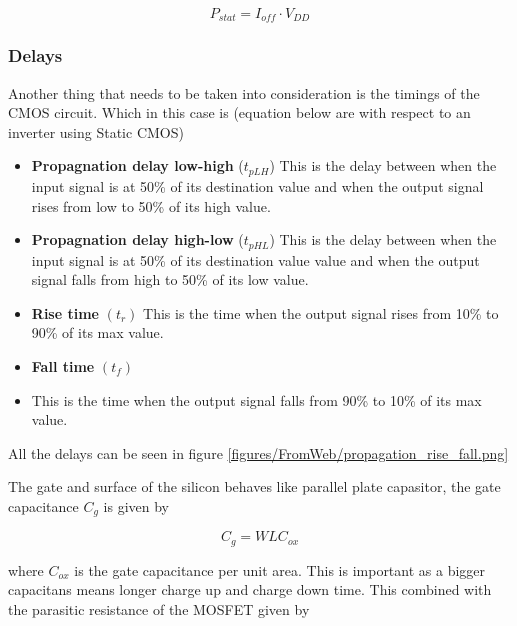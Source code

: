 \begin{equation}
    P_{stat}=I_{off}\cdot V_{DD}
    \label{eq:leakage_power}
\end{equation}

\subsubsection{Delays}
Another thing that needs to be taken into consideration is the timings of the CMOS circuit. Which in this case is (equation below are with respect to an inverter using Static CMOS) \cite{departmentofelectronicsystemsntnu_2023_delay}
\begin{itemize}
    \item \textbf{Propagnation delay low-high} ($t_{pLH}$)
    \subitem This is the delay between when the input signal is at 50\% of its destination value and when the output signal rises from low to 50\% of its high value.
    \item \textbf{Propagnation delay high-low} ($t_{pHL}$)
    \subitem This is the delay between when the input signal is at 50\% of its destination value value and when the output signal falls from high to 50\% of its low value.\cite{wikipediacontributors_2023_signal}
    \item \textbf{Rise time} $\left(t_r\right)$
    \subitem This is the time when the output signal rises from 10\% to 90\% of its max value.
    \item \textbf{Fall time} $\left(t_f\right)$
    \item \subitem This is the time when the output signal falls from 90\% to 10\% of its max value.
\end{itemize}

All the delays can be seen in figure \ref{figures/FromWeb/propagation_rise_fall.png}


The gate and surface of the silicon behaves like parallel plate capasitor, the gate capacitance $C_g$ is given by \cite[p. 18]{carusone_2012_analog}

\begin{equation}
    C_g=WLC_{ox}
    \label{eq:gate_capacitance}
\end{equation}

where $C_{ox}$ is the gate capacitance per unit area. This is important as a bigger capacitans means longer charge up and charge down time. This combined with the parasitic resistance of the MOSFET given by \cite{departmentofelectronicsystemsntnu_2023_delay}


